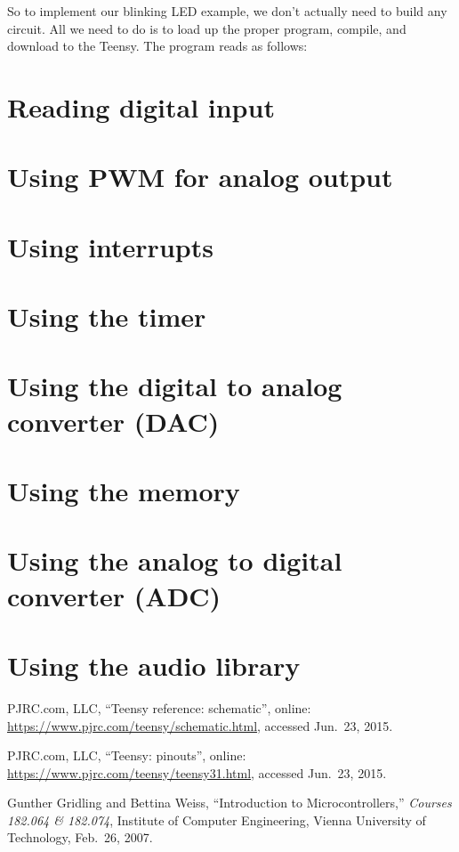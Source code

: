 \documentclass[letterpaper, 11pt]{article}
\begin{document}
So to implement our blinking LED example, we don't actually need to build any circuit. All we need to do is to load up the proper program, compile, and download to the Teensy. The program reads as follows: 


\section{Reading digital input}

\section{Using PWM for analog output}

\section{Using interrupts}

\section{Using the timer}

\section{Using the digital to analog converter (DAC)}

\section{Using the memory}

\section{Using the analog to digital converter (ADC)}

\section{Using the audio library}


\begin{thebibliography}{9}

  PJRC.com, LLC, ``Teensy reference: schematic'', online: \url{https://www.pjrc.com/teensy/schematic.html}, accessed Jun.~23, 2015.

  PJRC.com, LLC, ``Teensy: pinouts'', online: \url{https://www.pjrc.com/teensy/teensy31.html}, accessed Jun.~23, 2015.

Gunther Gridling and Bettina Weiss, ``Introduction to Microcontrollers,'' \emph{Courses 182.064 \& 182.074}, Institute of Computer Engineering, Vienna University of Technology, Feb.~26, 2007.


\end{thebibliography}
\end{document}
